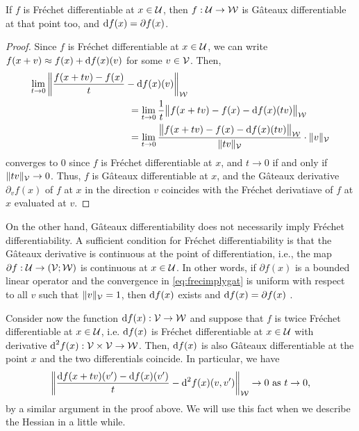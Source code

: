 \begin{lemma}
  If $f$ is Fréchet differentiable at $x\in{\mathcal U}$, then $f:{\mathcal U}\to{\mathcal W}$ is Gâteaux differentiable at that point too, and $\text{d} f(x) = \partial f(x)$.
\end{lemma}

\begin{proof}
  Since $f$ is Fréchet differentiable at $x\in{\mathcal U}$, we can write $f(x+v) \approx f(x) + \text{d} f(x)(v)$ for some $v\in{\mathcal V}$.
  Then, 
  \begin{align}\label{eq:frecimplygat}
    \lim_{t\to 0}  & \left\Vert \frac{f(x + t v) - f(x)}{t} - \d f(x)(v) \right\Vert_\cW \\
    &\hspace{3cm}= \lim_{t\to 0} \frac{1}{t} \big\Vert f(x + t v) - f(x) - \d f(x)(tv)  \big\Vert_\cW \nonumber \\
    &\hspace{3cm}= \lim_{t\to 0} \frac{\big\Vert f(x + t v) - f(x) - \d f(x)(tv) \big\Vert_\cW }{\norm{tv}_\cV}\cdot \norm{v}_\cV  \nonumber
  \end{align}
  converges to 0 since $f$ is Fréchet differentiable at $x$, and  $t\to 0$ if and only if $\lVert tv\rVert_{\mathcal V} \to 0$.
  Thus, $f$ is Gâteaux differentiable at $x$, and the Gâteaux derivative $\partial_v f(x)$ of $f$ at $x$ in the direction $v$ coincides with the Fréchet derivatiave of $f$ at $x$ evaluated at $v$.
\end{proof}

On the other hand, Gâteaux differentiability does not necessarily imply Fréchet differentiability.
A sufficient condition for Fréchet differentiability is  that the Gâteaux derivative is continuous at the point of differentiation, i.e., the map $\partial f: {\mathcal U} \to ({\mathcal V};{\mathcal W})$ is continuous at $x\in{\mathcal U}$.
In other words, if $\partial f(x)$ is a bounded linear operator and the convergence in \eqref{eq:frecimplygat} is uniform with respect to all $v$ such that $\lVert v\rVert_{\mathcal V}=1$, then $\text{d} f(x)$ exists and $\text{d} f(x) = \partial f(x)$ \citep[p. 57 \& 66]{tapia1971diff}.

Consider now the function $\text{d} f(x):{\mathcal V}\to{\mathcal W}$ and suppose that $f$ is twice Fréchet differentiable at $x\in{\mathcal U}$, i.e. $\text{d} f(x)$ is Fréchet differentiable at $x\in{\mathcal U}$ with derivative $\text{d}^2 f(x):{\mathcal V}\times{\mathcal V} \to {\mathcal W}$.
Then, $\text{d} f(x)$ is also Gâteaux differentiable at the point $x$ and the two differentials coincide.
In particular, we have
\begin{align}\label{eq:frech2gat}
  \left\Vert \frac{\text{d} f(x + t v)(v') - \text{d} f(x)(v')}{t} - \text{d}^2 f(x)(v,v') \right\Vert_{\mathcal W} \to 0 \text{ as } t \to 0,
\end{align}
by a similar argument in the proof above.
We will use this fact when we describe the Hessian in a little while.

